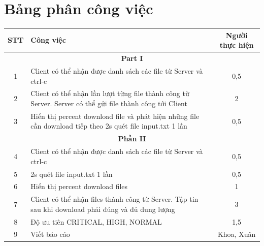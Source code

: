 \documentclass[a4paper,12pt]{report}
\begin{document}
\section{Bảng phân công việc}
\begin{center}
  \renewcommand{\arraystretch}{1.5}
  \begin{tabular}{|c|p{}|c|}
    \hline
    \textbf{STT} & \textbf{Công việc}                                                                                         & \textbf{Người thực hiện} \\\hline
    \multicolumn{3}{|c|}{\textbf{Part I}}                                                                                                                \\\hline
    1            & Client có thể nhận được danh sách các file từ Server và ctrl-c                                             & 0,5                      \\\hline
    2            & Client có thể nhận lần lượt từng file thành công từ Server. Server có thể gửi file thành công tới Client   & 2                        \\\hline
    3            & Hiển thị percent download file và phát hiện những file cần download tiếp theo 2s quét file input.txt 1 lần & 0,5                      \\\hline
    \multicolumn{3}{|c|}{\textbf{Phần II}}                                                                                                               \\\hline
    4            & Client có thể nhận được danh sách các file từ Server và ctrl-c                                             & 0,5                      \\\hline
    5            & 2s quét file input.txt 1 lần                                                                               & 0,5                      \\\hline
    6            & Hiển thị percent download files                                                                            & 1                        \\\hline
    7            & Client có thể nhận files thành công từ Server. Tập tin sau khi download phải đúng và đủ dung lượng         & 3                        \\\hline
    8            & Độ ưu tiên CRITICAL, HIGH, NORMAL                                                                          & 1,5                      \\\hline
    9            & Viết báo cáo                                                                                               & Khoa, Xuân               \\\hline
  \end{tabular}
\end{center}
\end{document}
